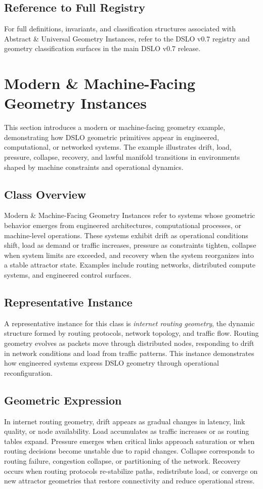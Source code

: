 \subsection{Reference to Full Registry}
For full definitions, invariants, and classification structures associated with Abstract \& Universal 
Geometry Instances, refer to the DSLO v0.7 registry and geometry classification surfaces in the main 
DSLO v0.7 release.


\section{Modern \& Machine-Facing Geometry Instances}
\label{sec:machine-facing}

This section introduces a modern or machine-facing geometry example, demonstrating how DSLO geometric 
primitives appear in engineered, computational, or networked systems. The example illustrates drift, 
load, pressure, collapse, recovery, and lawful manifold transitions in environments shaped by machine 
constraints and operational dynamics.

\subsection{Class Overview}
Modern \& Machine-Facing Geometry Instances refer to systems whose geometric behavior emerges from 
engineered architectures, computational processes, or machine-level operations. These systems exhibit 
drift as operational conditions shift, load as demand or traffic increases, pressure as constraints 
tighten, collapse when system limits are exceeded, and recovery when the system reorganizes into a 
stable attractor state. Examples include routing networks, distributed compute systems, and engineered 
control surfaces.

\subsection{Representative Instance}
A representative instance for this class is \emph{internet routing geometry}, the dynamic structure 
formed by routing protocols, network topology, and traffic flow. Routing geometry evolves as packets 
move through distributed nodes, responding to drift in network conditions and load from traffic 
patterns. This instance demonstrates how engineered systems express DSLO geometry through operational 
reconfiguration.

\subsection{Geometric Expression}
In internet routing geometry, drift appears as gradual changes in latency, link quality, or node 
availability. Load accumulates as traffic increases or as routing tables expand. Pressure emerges when 
critical links approach saturation or when routing decisions become unstable due to rapid changes. 
Collapse corresponds to routing failure, congestion collapse, or partitioning of the network. Recovery 
occurs when routing protocols re-stabilize paths, redistribute load, or converge on new attractor 
geometries that restore connectivity and reduce operational stress.

